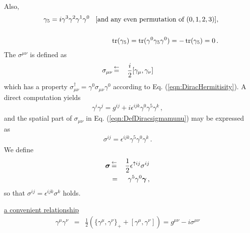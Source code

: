 Also,
\begin{eqnarray}
&&\gamma_5 
=
i \gamma^3 \gamma^2 \gamma^1 \gamma^0
\hspace{3mm}
[\mbox{and any even permutation of }(0, 1, 2, 3)],
\\
\nonumber\\
&&\operatorname{tr}( \gamma_5 ) 
=
\operatorname{tr}( \gamma^0 \gamma_5 \gamma^0) 
=
-\operatorname{tr}( \gamma_5 ) 
= 0
\,.
\end{eqnarray}
The $\sigma^{\mu \nu}$ is defined as
\begin{eqnarray}
\sigma_{\mu \nu} &\,\mbox{$\stackrel{\leftarrow}{=}$}\,&
\frac{i}{2}
[ \gamma_\mu, \gamma_\nu]
\label{eqn:DefDiracsigmamunu}
\end{eqnarray}
which has a property $\sigma_{\mu \nu}^\dagger = \gamma^0 \sigma_{\mu \nu} \gamma^0$
according to Eq. (\ref{eqn:DiracHermitisity}).
A direct computation yields
\begin{eqnarray}
\gamma^i \gamma^j
=
g^{ij} + 
i \epsilon^{ijk}\gamma^0 \gamma^5 \gamma^k\,,
\end{eqnarray}
and the spatial part of $\sigma_{\mu \nu}$ in Eq. (\ref{eqn:DefDiracsigmamunu}) may be expressed as
\begin{eqnarray}
\sigma^{i j} 
=
\epsilon^{i j k} \gamma^5 \gamma^0 \gamma^k
\,.
\end{eqnarray}
We define
\begin{eqnarray}
\mbox{\boldmath $\sigma$} &\,\mbox{$\stackrel{\leftarrow}{=}$}\,& \frac{1}{2} \epsilon^{\uparrow i j} \sigma^{i j} 
\label{eqn:defDiracSigma}
\\
&=&
\gamma^5 \gamma^0 \mbox{\boldmath $\gamma$}
\,,
\end{eqnarray}
so that $\sigma^{ij} = \epsilon^{ijk} \sigma^k$ holds.
\bigskip

\noindent
\underline{a convenient relationship}
\begin{eqnarray}
\gamma^\mu \gamma^\nu
&=&
\frac{1}{2}
\left(
\{\gamma^\mu, \gamma^\nu \}_+ +
\left[ \gamma^\mu,  \gamma^\nu \right]
\right)
=
g^{\mu \nu} - i \sigma^{\mu \nu}
\end{eqnarray}

\bigskip

